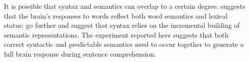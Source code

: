 \documentclass[a4paper,10pt,twoside]{article}
\begin{document}
It is possible that syntax and semantics can overlap to a certain
degree. \cite{Pulvermuller2002} suggests that the brain's responses to
words reflect both word semantics and lexical status;
\cite{KempsonEtAl2016} go further and suggest that syntax relies on
the incremental building of semantic representations. The experiment
reported here suggests that both correct syntactic and predictable
semantics need to occur together to generate a full brain response
during sentence comprehension. 

%


\end{document}
